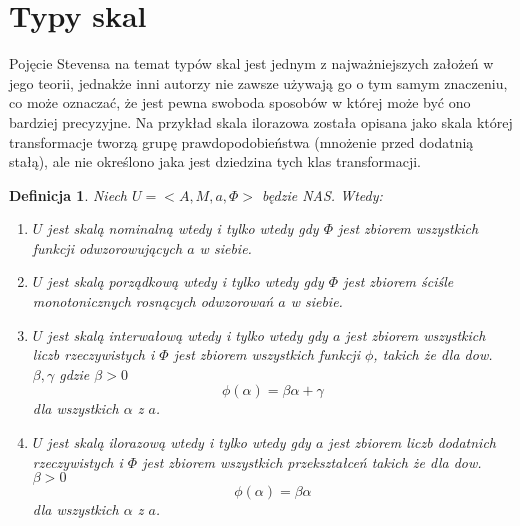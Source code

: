 \documentclass[12pt,a4paper]{report}
\newtheorem{definition}{Definicja}
\begin{document}
\section{Typy skal}
Pojęcie Stevensa na temat typów skal jest jednym z najważniejszych założeń w jego teorii, jednakże inni autorzy nie zawsze używają go o tym samym znaczeniu, co może oznaczać, że jest pewna swoboda sposobów w której może być ono bardziej precyzyjne. Na przykład skala ilorazowa została opisana jako skala której transformacje tworzą grupę prawdopodobieństwa (mnożenie przed dodatnią stałą), ale nie określono jaka jest dziedzina tych klas transformacji.  
\begin{definition}
Niech $U=<A, M, a, \Phi>$ będzie NAS. Wtedy:
\begin{enumerate}
\item
$U$ jest skalą nominalną wtedy i tylko wtedy gdy $\Phi$ jest zbiorem wszystkich funkcji odwzorowujących $a$ w siebie.
\item
$U$ jest skalą porządkową wtedy i tylko wtedy gdy $\Phi$ jest zbiorem ściśle monotonicznych rosnących odwzorowań $a$ w siebie.
\item
$U$ jest skalą interwałową wtedy i tylko wtedy gdy $a$ jest zbiorem wszystkich liczb rzeczywistych i $\Phi$ jest zbiorem wszystkich funkcji $\phi$, takich że dla dow. $\beta,\gamma$ gdzie $\beta>0$
\begin{equation*}
\phi(\alpha)=\beta\alpha+\gamma
\end{equation*}
dla wszystkich $\alpha$ z $a$.
\item
$U$ jest skalą ilorazową wtedy i tylko wtedy gdy $a$ jest zbiorem liczb dodatnich rzeczywistych i $\Phi$ jest zbiorem wszystkich przekształceń takich że dla dow. $\beta>0$
\begin{equation*}
\phi(\alpha)=\beta\alpha
\end{equation*}
dla wszystkich $\alpha$ z $a$.
\end{enumerate}
\end{definition}
\end{document}
